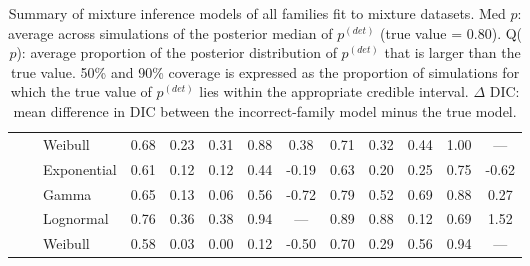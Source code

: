 \documentclass[useAMS,usenatbib,referee,12pt]{article}
\newcommand{\pdet}{p^{(det)}}
\begin{document}
\begin{table}[ht]
\begin{tabular}{l|l|l|ccccc|ccccc}
& &   Weibull & 0.68 & 0.23 & 0.31 & 0.88 & 0.38 & 0.71 & 0.32 & 0.44 & 1.00 & --- \\ 
\cline{2-13}
& &   Exponential & 0.61 & 0.12 & 0.12 & 0.44 & -0.19 & 0.63 & 0.20 & 0.25 & 0.75 & -0.62 \\ 
\cline{2-13}
& \parbox[t]{2mm}{} & Gamma & 0.65 & 0.13 & 0.06 & 0.56 & -0.72 & 0.79 & 0.52 & 0.69 & 0.88 & 0.27 \\ 
& &   Lognormal & 0.76 & 0.36 & 0.38 & 0.94 & --- & 0.89 & 0.88 & 0.12 & 0.69 & 1.52 \\ 
& &   Weibull & 0.58 & 0.03 & 0.00 & 0.12 & -0.50 & 0.70 & 0.29 & 0.56 & 0.94 & --- \\ 
   \hline
\end{tabular}
\caption{Summary of mixture inference models of all families fit to mixture datasets.  
Med $p$: average across simulations of the posterior median of $\pdet$ (true value = 0.80).  
Q($p$): average proportion of the posterior distribution of $\pdet$ that is larger than the true value.  
50\% and 90\% coverage is expressed as the proportion of simulations for which the true value of $\pdet$ lies within the appropriate credible interval.  
$\Delta$ DIC: mean difference in DIC between the incorrect-family model minus the true model.}
\label{tbl:sim2}
\end{table}

\else
\end{document}
